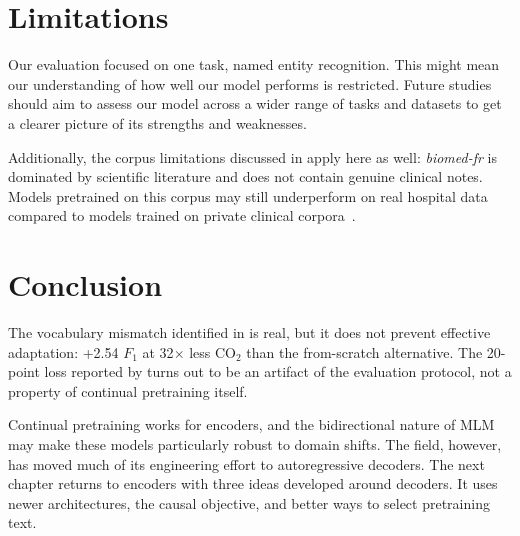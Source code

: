 \section{Limitations}

\begin{reviewread}
Our evaluation focused on one task, named entity recognition. This might mean our understanding of how well our model performs is restricted. Future studies should aim to assess our model across a wider range of tasks and datasets to get a clearer picture of its strengths and weaknesses.
\end{reviewread}

\begin{reviewread}
Additionally, the corpus limitations discussed in  apply here as well: \textit{biomed-fr} is dominated by scientific literature and does not contain genuine clinical notes. Models pretrained on this corpus may still underperform on real hospital data compared to models trained on private clinical corpora~\citep{dura_learning_2022}.
\end{reviewread}


\section*{Conclusion}

\begin{reviewread}
The vocabulary mismatch identified in  is real, but it does not prevent effective adaptation: +2.54 $F_1$ at 32$\times$ less CO$_2$ than the from-scratch alternative. The 20-point loss reported by \citet{labrak2023drbert} turns out to be an artifact of the evaluation protocol, not a property of continual pretraining itself.
\end{reviewread}

\vspace{2em}

\begin{reviewread}
Continual pretraining works for encoders, and the bidirectional nature of MLM may make these models particularly robust to domain shifts. The field, however, has moved much of its engineering effort to autoregressive decoders. The next chapter returns to encoders with three ideas developed around decoders. It uses newer architectures, the causal objective, and better ways to select pretraining text.
\end{reviewread}
